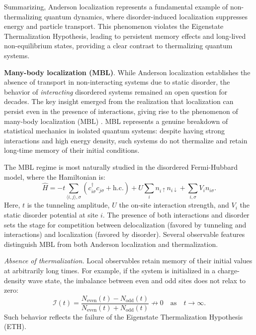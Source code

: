 Summarizing, Anderson localization represents a fundamental example of non-thermalizing quantum dynamics, where disorder-induced localization suppresses energy and particle transport. This phenomenon violates the Eigenstate Thermalization Hypothesis, leading to persistent memory effects and long-lived non-equilibrium states, providing a clear contrast to thermalizing quantum systems.



\textbf{Many-body localization (MBL)}.
While Anderson localization establishes the absence of transport in non-interacting systems due to static disorder, the behavior of \emph{interacting} disordered systems remained an open question for decades. The key insight emerged from the realization that localization can persist even in the presence of interactions, giving rise to the phenomenon of many-body localization (MBL) \cite{basko_metalinsulator_2006,nandkishore_many-body_2015,abanin_colloquium_2019}. MBL represents a genuine breakdown of statistical mechanics in isolated quantum systems: despite having strong interactions and high energy density, such systems do not thermalize and retain long-time memory of their initial conditions.

The MBL regime is most naturally studied in the disordered Fermi-Hubbard model, where the Hamiltonian is:
\begin{equation}
\hat{H} = -t \sum_{\langle i, j \rangle, \sigma} (c^\dagger_{i \sigma} c_{j \sigma} + \text{h.c.}) + U \sum_i n_{i \uparrow} n_{i \downarrow} + \sum_{i, \sigma} V_i n_{i \sigma}.
\label{eq:fh-mbl}
\end{equation}
Here, $t$ is the tunneling amplitude, $U$ the on-site interaction strength, and $V_i$ the static disorder potential at site $i$. The presence of both interactions and disorder sets the stage for competition between delocalization (favored by tunneling and interactions) and localization (favored by disorder). Several observable features distinguish MBL from both Anderson localization and thermalization.


\emph{Absence of thermalization.} Local observables retain memory of their initial values at arbitrarily long times. For example, if the system is initialized in a charge-density wave state, the imbalance between even and odd sites does not relax to zero:
\begin{equation}
\mathcal{I}(t) = \frac{N_\text{even}(t) - N_\text{odd}(t)}{N_\text{even}(t) + N_\text{odd}(t)} \not\rightarrow 0 \quad \text{as} \quad t \to \infty.
\end{equation}
Such behavior reflects the failure of the Eigenstate Thermalization Hypothesis (ETH).

